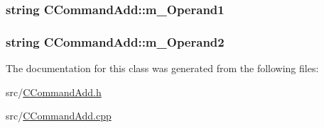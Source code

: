 \subsubsection[{\texorpdfstring{m\+\_\+\+Operand1}{m_Operand1}}]{\setlength{\rightskip}{0pt plus 5cm}string C\+Command\+Add\+::m\+\_\+\+Operand1\hspace{0.3cm}{\ttfamily [private]}}\hypertarget{classCCommandAdd_abcd42da999946000498850d594d2720b}{}\label{classCCommandAdd_abcd42da999946000498850d594d2720b}
\subsubsection[{\texorpdfstring{m\+\_\+\+Operand2}{m_Operand2}}]{\setlength{\rightskip}{0pt plus 5cm}string C\+Command\+Add\+::m\+\_\+\+Operand2\hspace{0.3cm}{\ttfamily [private]}}\hypertarget{classCCommandAdd_aa27354561d8bfe6e81409fbe35dfede8}{}\label{classCCommandAdd_aa27354561d8bfe6e81409fbe35dfede8}


The documentation for this class was generated from the following files\+:\begin{DoxyCompactItemize}
\item 
src/\hyperlink{CCommandAdd_8h}{C\+Command\+Add.\+h}\item 
src/\hyperlink{CCommandAdd_8cpp}{C\+Command\+Add.\+cpp}\end{DoxyCompactItemize}
